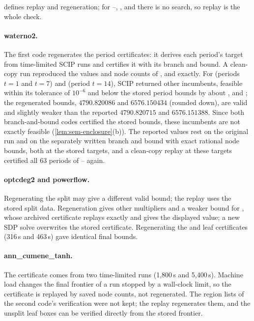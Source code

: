  defines replay and regeneration; for --, ,  and  there is no search, so replay is the whole check.

\paragraph{waterno2.}
The first code regenerates the period certificates: it derives each period's target from time-limited SCIP runs and certifies it with its branch and bound.
A clean-copy run reproduced the values and node counts of ,  and  exactly.
For  (periods $t=1$ and $t=7$) and  (period $t=14$), SCIP returned other incumbents, feasible within its tolerance of $10^{-6}$ and below the stored period bounds by about ,  and ; the regenerated bounds, $4790.820086$ and $6576.150434$ (rounded down), are valid and slightly weaker than the reported $4790.820715$ and $6576.151388$.
Since both branch-and-bound codes certified the stored bounds, these incumbents are not exactly feasible (\cref{lem:sem-enclosure}(b)).
The reported values rest on the original run and on the separately written branch and bound with exact rational node bounds, both at the stored targets, and a clean-copy replay at these targets certified all 63 periods of -- again.

\paragraph{optcdeg2 and powerflow.}
Regenerating the  split may give a different valid bound; the replay uses the stored split data.
Regeneration gives other multipliers and a weaker bound for , whose archived certificate replays exactly and gives the displayed value; a new SDP solve overwrites the stored certificate.
Regenerating the  and  leaf certificates (316\,s and 463\,s) gave identical final bounds.

\paragraph{ann\_cumene\_tanh.}
The certificate comes from two time-limited runs (1,800\,s and 5,400\,s).
Machine load changes the final frontier of a run stopped by a wall-clock limit, so the certificate is replayed by saved node counts, not regenerated.
The region lists of the second code's verification were not kept; the replay regenerates them, and the unsplit leaf boxes can be verified directly from the stored frontier.

